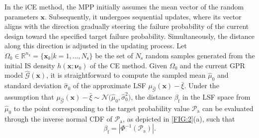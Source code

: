 \documentclass[preprint,3p]{elsarticle}
\begin{document}
\begin{linenumbers}
In the iCE method, the MPP initially assumes the mean vector of the random parameters $\textbf{x}$. Subsequently, it undergoes sequential updates, where its vector aligns with the direction gradually steering the failure probability of the current design toward the specified target failure probability.
Simultaneously, the distance along this direction is adjusted in the updating process. Let $\Omega_\text{0} \in \mathbb{R}^{n_\text{x}}=\{\textbf{x}_k|k=1,\dots,N_\text{s}\}$ be the set of $N_\text{s}$ random samples generated from the initial IS density ${h}\left(\textbf{x};\boldsymbol{\nu}_0\right)$ of the CE method. Given $\Omega_\text{0}$ and the current GPR model $\widehat{\mathcal{G}}(\textbf{x})$, it is straightforward to compute the sampled mean $\hat{\mu}_0$ and standard deviation $\hat{\sigma}_0$ of the approximate LSF $\mu_{\widehat{\mathcal{G}}}(\textbf{x})-\bar\xi$. Under the assumption that $\mu_{\widehat{\mathcal{G}}}(\textbf{x})-\bar\xi\sim\mathcal{N}\bigl(\hat{\mu}_0,\hat{\sigma}_0^2\bigr)$, the distance $\beta_\text{f}$ in the LSF space from $\hat{\mu}_0$ to the point corresponding to the target probability value $\mathcal{P}_\text{a}$ can be evaluated through the inverse normal CDF of $\mathcal{P}_\text{a}$, as depicted in \cref{FIG:2}(a), such that
\begin{equation}
    \beta_\text{f} = |\Phi^{-1}(\mathcal{P}_\text{a})|.
    \label{EQ:23}
\end{equation}


\end{linenumbers}
\end{document}
